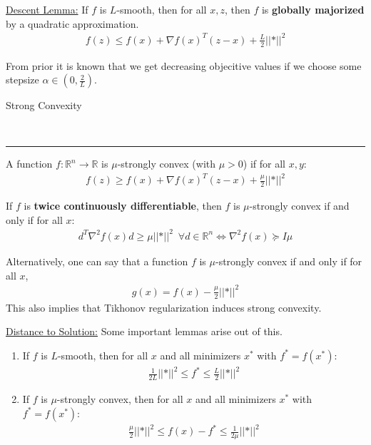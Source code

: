 \documentclass{article}
\newcommand{\header}[1]{\begin{large}\noindent #1\end{large}\\\rule{\textwidth}{0.5pt}}
\newcommand{\norm}[2]{\left\lvert\left\lvert#1\right\rvert\right\rvert}
\newcommand{\sheader}[1]{\underline{#1:}}
\begin{document}
\sheader{Descent Lemma}
If $f$ is $L$-smooth, then for all $x, z$, then $f$ is \textbf{globally majorized}
by a quadratic approximation.
\begin{align*}
    f(z) \leq f(x) + \nabla f(x)^T (z-x) + \frac{L}{2} \norm*{z-x}^2
\end{align*}

From prior it is known that we get decreasing objecitive values if we 
choose some stepsize $\alpha \in \left(0, \frac{2}{L}\right)$.

\pagebreak

\header{Strong Convexity}
A function $f : \mathbb{R}^n \to \mathbb{R}$ is $\mu$-strongly convex (with $\mu > 0$)
if for all $x, y$:
\begin{align*}
    f(z) \geq f(x) + \nabla f(x)^T(z-x) + \frac{\mu}{2}\norm*{z-x}^2
\end{align*}

If $f$ is \textbf{twice continuously differentiable}, then $f$ 
is $\mu$-strongly convex if and only if for all $x$:
\begin{align*}
    d^T\nabla^2 f(x) d \geq \mu \norm*{d}^2\,\,\, \forall d \in \mathbb{R}^n \iff \nabla^2 f(x) \succeq I\mu
\end{align*}

Alternatively, one can say that a function $f$ is $\mu$-strongly convex 
if and only if for all $x$,
\begin{align*}
    g(x) = f(x) - \frac{\mu}{2}\norm*{x}^2
\end{align*}
This also implies that Tikhonov regularization induces strong convexity.

\sheader{Distance to Solution} Some important lemmas arise out of this.
\begin{enumerate}
    \item If $f$ is $L$-smooth, then for all $x$ and all minimizers $x^*$
    with $f^* = f(x^*)$:
    \begin{align*}
        \frac{1}{2L} \norm*{\nabla f(x)}^2 \leq f^* \leq \frac{L}{2}\norm*{x-x^*}^2
    \end{align*}
    \item If $f$ is $\mu$-strongly convex, then for all $x$ and all 
    minimizers $x^*$ with $f^* = f(x^*)$:
    \begin{align*}
        \frac{\mu}{2}\norm*{x-x^*}^2 \leq f(x) - f^* \leq \frac{1}{2\mu} \norm*{\nabla f(x)}^2
    \end{align*}
\end{enumerate}
\end{document}
